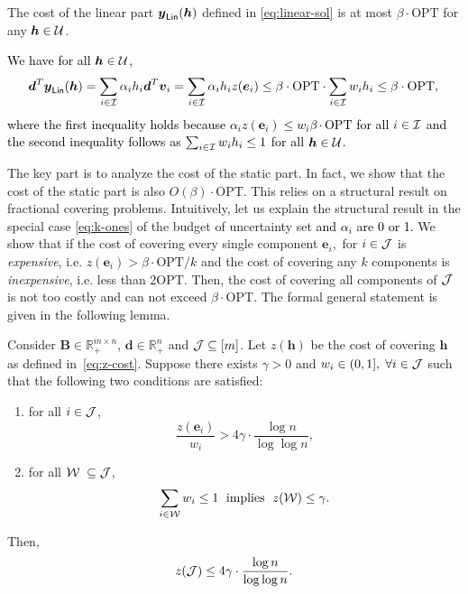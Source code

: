 \documentclass[moor]{informs1}              %
\newcommand{\opt}{\mathrm{OPT}}
\newcommand{\mb}[1]{\ensuremath{\boldsymbol{#1}}}
\newcommand*{\red}{\textcolor{black}}
\begin{document}
\begin{lemma} \label{lem:cost-linear}
The cost of the linear part $\mb y_{\sf Lin}(\mb h)$ defined in \eqref{eq:linear-sol}  is at most $\beta \cdot \opt $ for any $\mb h \in {\cal U}$.
\end{lemma}

\red{
We have for all $\mb h \in {\cal U}$,
$$
\mb d ^T\mb y_{\sf Lin}( \mb h )   =   \sum_{i \in {\cal I}} \alpha_i h_i \mb d^T{\mb v}_i =   \sum_{i \in {\cal I}} \alpha_i h_i  z( \mb e_i)   \leq   \beta \cdot \opt  \cdot \sum_{i \in {\cal I}} w_i h_i   \leq   \beta \cdot \opt,\\
$$
where the first inequality holds because $\alpha_i z( \mb e_i)  \leq w_i \beta \cdot \opt$ for all $i \in {\cal I}$ and the second inequality follows as $ \sum_{i \in {\cal I}} w_i h_i \leq 1$ for all $\mb h \in {\cal U}$.}
\hfill
\Halmos
\endproof


The key part is to analyze the cost of the static part. In fact, we show that the cost of the static part is also $O( \beta) \cdot \opt $. This relies on a structural result on  fractional covering problems. Intuitively, let us explain the structural result in the special case \eqref{eq:k-ones} of the budget of uncertainty set \red{and $\alpha_i$ are 0 or 1.}
We show that if the cost of covering every single component $\mb e_i, $ for $ i  \in {\cal J}$ is \textit{expensive}, i.e.  $ z(\mb e_i) >\beta \cdot \opt /k   $ and the cost of covering any $k$  components is \textit{inexpensive}, i.e. less than $2 \opt$. Then, the cost of covering all components of ${\cal J}$ is not too costly and can not exceed $\beta \cdot \opt$. The formal general statement is given in the following lemma.
\begin{lemma} \label{lem:structural-resulto}
Consider $\mb B \in \mathbb{R}^{m\times n}_+ $,  $ \mb d \in \mathbb{R}^n_+$ and  ${\cal J} \subseteq [m]$. Let $z(\mb h)$ be the cost of covering $\mb h$ as defined in~\eqref{eq:z-cost}.
Suppose there exists    $ \gamma >0$ and $w_i \in (0,1], \; \forall i \in {\cal J}$  such that the following two conditions are satisfied:
\begin{enumerate}
\item for all $ i \in {\cal J}$,  $$\frac{ z(\mb e_i)}{w_i}        >   4 \gamma \cdot \frac{\log n}{\log \log n},  $$ 
\item  for all ${\cal W} \; \subseteq {\cal J}$,
$$\sum_{i \in  {\cal W}} w_i \leq 1 \; \mbox{ implies }\; z({\cal W}) \leq \gamma.$$
\end{enumerate}
Then,  $$z({\cal J}) \leq  4 \gamma \cdot \frac{\log n}{\log \log n}.$$
\end{lemma}
\end{document}
